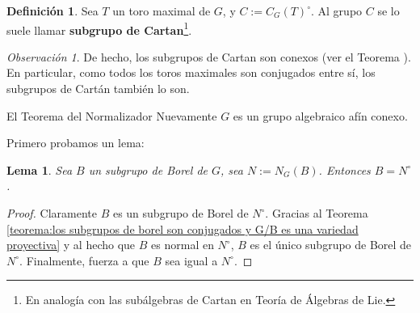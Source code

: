 \documentclass[spanish,12pt]{amsart}
\makeatletter
\renewcommand\subsection{\@startsection{subsection}{2}%
  \z@{.5\linespacing\@plus.7\linespacing}{-.5em}%
  {\normalfont\sffamily}}
\newtheorem{lemma}[theorem]{Lema}
\theoremstyle{definition}
\newtheorem{definition}[theorem]{Definición}
\theoremstyle{remark}
\newtheorem{remark}[theorem]{Observación}
\numberwithin{equation}{section}
\makeatother
\begin{document}
\begin{definition}
Sea $T$ un toro maximal de $G$, y $C := C_G (T)^\circ$. Al grupo $C$ se lo suele llamar \textbf{subgrupo de Cartan}\footnote{En analogía con las subálgebras de Cartan en Teoría de Álgebras de Lie.}.
\end{definition}

\begin{remark}
De hecho, los subgrupos de Cartan son conexos (ver el Teorema \cite[\S 22.3]{humphreys2012linearAlgebraicGroups}). En particular, como todos los toros maximales son conjugados entre sí, los subgrupos de Cartán también lo son.
\end{remark}


\subsection{El Teorema del Normalizador}
Nuevamente $G$ es un grupo algebraico afín conexo.

Primero probamos un lema:

\begin{lemma}
Sea $B$ un subgrupo de Borel de $G$, sea $N:= N_G(B)$. Entonces $B = N^\circ$.
\end{lemma}
\begin{proof}
Claramente $B$ es un subgrupo de Borel de $N^\circ$. Gracias al Teorema \ref{teorema:los subgrupos de borel son conjugados y G/B es una variedad proyectiva} y al hecho que $B$ es normal en $N^\circ$, $B$ es el único subgrupo de Borel de $N^\circ$. Finalmente, \cite[Teorema de Densidad \S 22.2]{humphreys2012linearAlgebraicGroups} fuerza a que $B$ sea igual a $N^\circ$.
\end{proof}
\end{document}
